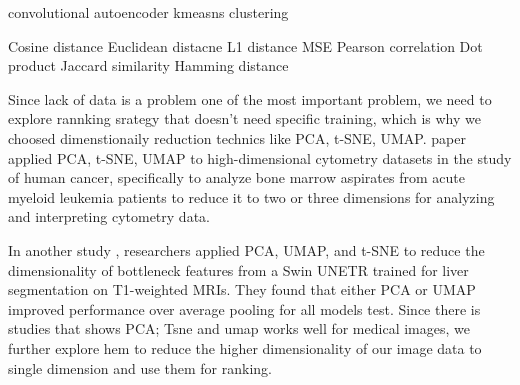 convolutional autoencoder 
kmeasns clustering


Cosine distance
Euclidean distacne 
L1 distance
MSE
Pearson correlation
Dot product
Jaccard similarity
Hamming distance

Since lack of data is a problem one of the most important problem, we need to explore rannking srategy that doesn't need specific training, which is why we choosed dimenstionaily reduction technics like PCA, t-SNE, UMAP. \cite{keyes2020cancerprimer} paper applied PCA, t-SNE, UMAP to high-dimensional cytometry datasets in the study of human cancer, specifically to analyze bone marrow aspirates from acute myeloid leukemia patients to reduce it to two or three dimensions for analyzing and interpreting cytometry data. 

In another study \cite{edwoodland_2024_13881989}, researchers applied PCA, UMAP, and t-SNE to reduce the dimensionality of bottleneck features from a Swin UNETR trained for liver segmentation on T1-weighted MRIs. They found that either PCA or UMAP improved performance over average pooling for all models test. Since there is studies that shows PCA; Tsne and umap works well for medical images, we further explore hem to reduce the higher dimensionality of our image data to single dimension and use them for ranking.